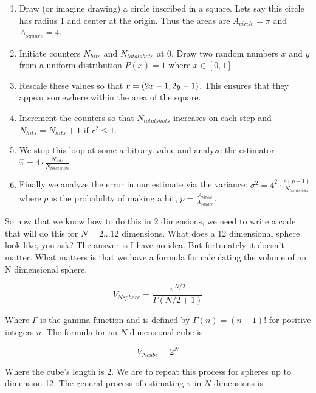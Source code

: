 \documentclass[11pt]{amsart}
\begin{document}
\begin{enumerate}
\item Draw (or imagine drawing) a circle inscribed in a square. Lets say this circle has radius 1 and center at the origin.  Thus the areas are $A_{circle}=\pi$ and $A_{square}=4$.
\item Initiate counters $N_{hits}$ and $N_{total shots}$ at $0$.  Draw two random numbers $x$ and $y$ from a uniform distribution $P(x)=1$ where $x \in [0,1]$.  
\item Rescale these values so that $\textbf r =(2x-1,2y-1)$.  This ensures that they appear somewhere within the area of the square.
\item Increment the counters so that $N_{total shots}$ increases on each step and $N_{hits}=N_{hits}+1$ if $r^2 \leq 1$.
\item We stop this loop at some arbitrary value and analyze the estimator $\hat \pi = 4 \cdot \frac {N_{hits}} {N_{total shots}}$
\item Finally we analyze the error in our estimate via the variance: \newline $\sigma ^2 = 4^2 \cdot \frac{p (p-1)}{N_{totalshots}}$ where $p$ is the probability of making a hit, $p=\frac{A_{circle}}{A_{square}}$.
\end{enumerate}
\vspace{5 mm}

So now that we know how to do this in 2 dimensions, we need to write a code that will do this for $N=2...12$ dimensions.  What does a 12 dimensional sphere look like, you ask?  The answer is I have no idea.  But fortunately it doesn't matter.  What matters is that we have a formula for calculating the volume of an N dimensional sphere.

\begin{equation}
V_{Nsphere} = \frac {\pi ^{N/2}} {\Gamma (N/2+1)}
\end{equation}
\vspace{5 mm}

Where $\Gamma$ is the gamma function and is defined by $\Gamma(n)=(n-1)!$ for positive integers $n$.  The formula for an $N$ dimensional cube is 

\begin{equation}
V_{Ncube}=2^N
\end{equation}
\vspace{5 mm}

Where the cube's length is 2.  We are to repeat this process for spheres up to dimension 12.  The general process of estimating $\pi$ in $N$ dimensions is
\end{document}
